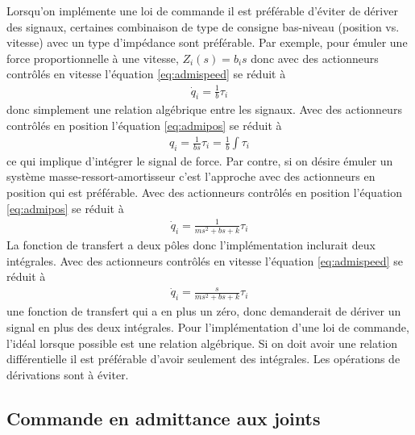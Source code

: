 Lorsqu'on implémente une loi de commande il est préférable d'éviter de dériver des signaux, certaines combinaison de type de consigne bas-niveau (position vs. vitesse) avec un type d'impédance sont préférable. Par exemple, pour émuler une force proportionnelle à une vitesse, $Z_i(s) = b_i s$ donc avec des actionneurs contrôlés en vitesse l'équation \eqref{eq:admispeed} se réduit à 
\begin{align}
\dot{q}_i = \frac{1}{b} \tau_i
\end{align}
donc simplement une relation algébrique entre les signaux. Avec des actionneurs contrôlés en position l'équation \eqref{eq:admipos} se réduit à 
\begin{align}
q_i = \frac{1}{b s} \tau_i = \frac{1}{b} \int \tau_i
\end{align}
ce qui implique d'intégrer le signal de force. Par contre, si on désire émuler un système masse-ressort-amortisseur c'est l'approche avec des actionneurs en position qui est préférable. Avec des actionneurs contrôlés en position l'équation \eqref{eq:admipos} se réduit à  
\begin{align}
\dot{q}_i = \frac{1}{ms^2+bs+k} \tau_i
\end{align}
La fonction de transfert a deux pôles donc l'implémentation inclurait deux intégrales. Avec des actionneurs contrôlés en vitesse l'équation \eqref{eq:admispeed} se réduit à 
\begin{align}
\dot{q}_i = \frac{s}{ms^2+bs+k} \tau_i
\end{align}
une fonction de transfert qui a en plus un zéro, donc demanderait de dériver un signal en plus des deux intégrales. Pour l'implémentation d'une loi de commande, l'idéal lorsque possible est une relation algébrique. Si on doit avoir une relation différentielle il est préférable d'avoir seulement des intégrales. Les opérations de dérivations sont à éviter. 

\subsection{Commande en admittance aux joints}
\label{sec:jointadmcontrol}


